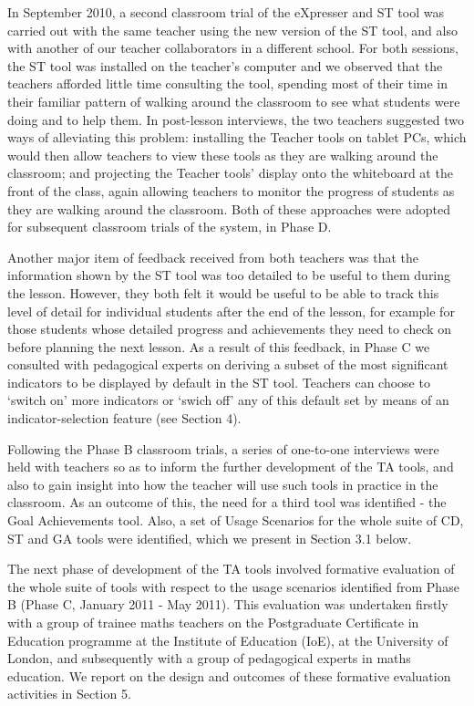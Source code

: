 In September 2010, a second classroom trial of the eXpresser and ST
tool was carried out with the same teacher using the new version of
the ST tool, and also with another of our teacher collaborators in a
different school. For both sessions, the ST tool was installed on the
teacher’s computer and we observed that the teachers afforded little
time consulting the tool, spending most of their time in their
familiar pattern of walking around the classroom to see what students
were doing and to help them. In post-lesson interviews, the two
teachers suggested two ways of alleviating this problem: installing
the Teacher tools on tablet PCs, which would then allow teachers to
view these tools as they are walking around the classroom; and
projecting the Teacher tools' display onto the whiteboard at the front
of the class, again allowing teachers to monitor the progress of
students as they are walking around the classroom. Both of these
approaches were adopted for subsequent classroom trials of the system,
in Phase D.
 
Another major item of feedback received from both teachers was that
the information shown by the ST tool was too detailed to be useful to
them during the lesson. However, they both felt it would be useful to
be able to track this level of detail for individual students after
the end of the lesson, for example for those students whose detailed
progress and achievements they need to check on before planning the
next lesson. As a result of this feedback, in Phase C we consulted
with pedagogical experts on deriving a subset of the most significant
indicators to be displayed by default in the ST tool. Teachers can
choose to `switch on' more indicators or `swich off' any of this
default set by means of an indicator-selection feature (see Section
4).

Following the Phase B classroom trials, a series of one-to-one
interviews were held with teachers so as to inform the further
development of the TA tools, and also to gain insight into how the
teacher will use such tools in practice in the classroom. As an
outcome of this, the need for a third tool was identified - the Goal
Achievements tool. Also, a set of Usage Scenarios for the whole suite
of CD, ST and GA tools were identified, which we present in Section
3.1 below.

The next phase of development of the TA tools involved formative
evaluation of the whole suite of tools with respect to the usage
scenarios identified from Phase B (Phase C, January 2011 - May
2011). This evaluation was undertaken firstly with a group of trainee
maths teachers on the Postgraduate Certificate in Education programme
at the Institute of Education (IoE), at the University of London, and
subsequently with a group of pedagogical experts in maths
education. We report on the design and outcomes of these formative
evaluation activities in Section 5.
 
